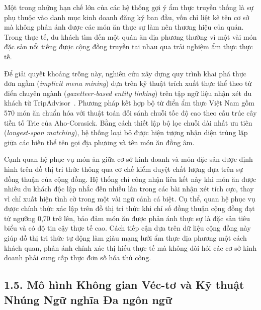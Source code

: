 Một trong những hạn chế lớn của các hệ thống gợi ý ẩm thực truyền thống là sự phụ thuộc vào danh mục kinh doanh đăng ký ban đầu, vốn chỉ liệt kê tên cơ sở mà không phản ánh được các món ăn thực sự làm nên thương hiệu của quán. Trong thực tế, du khách tìm đến một quán ăn địa phương thường vì một vài món đặc sản nổi tiếng được cộng đồng truyền tai nhau qua trải nghiệm ẩm thực thực tế.

Để giải quyết khoảng trống này, nghiên cứu xây dựng quy trình khai phá thực đơn ngầm (\textit{implicit menu mining}) dựa trên kỹ thuật trích xuất thực thể theo từ điển chuyên ngành (\textit{gazetteer-based entity linking}) trên tập ngữ liệu nhận xét du khách từ TripAdvisor~\cite{tripadvisor2024}. Phương pháp kết hợp bộ từ điển ẩm thực Việt Nam gồm 570 món ăn chuẩn hóa với thuật toán đối sánh chuỗi tốc độ cao theo cấu trúc cây tiền tố Trie của Aho-Corasick. Bằng cách thiết lập bộ lọc chuỗi dài nhất ưu tiên (\textit{longest-span matching}), hệ thống loại bỏ được hiện tượng nhận diện trùng lặp giữa các biến thể tên gọi địa phương và tên món ăn đồng âm.

Cạnh quan hệ phục vụ món ăn giữa cơ sở kinh doanh và món đặc sản được định hình trên đồ thị tri thức thông qua cơ chế kiểm duyệt chất lượng dựa trên sự đồng thuận của cộng đồng. Hệ thống chỉ công nhận liên kết này khi món ăn được nhiều du khách độc lập nhắc đến nhiều lần trong các bài nhận xét tích cực, thay vì chỉ xuất hiện tình cờ trong một vài ngữ cảnh cá biệt. Cụ thể, quan hệ phục vụ được chính thức xác lập trên đồ thị tri thức khi chỉ số đồng thuận cộng đồng đạt từ ngưỡng 0,70 trở lên, bảo đảm món ăn được phản ánh thực sự là đặc sản tiêu biểu và có độ tin cậy thực tế cao. Cách tiếp cận dựa trên dữ liệu cộng đồng này giúp đồ thị tri thức tự động làm giàu mạng lưới ẩm thực địa phương một cách khách quan, phản ánh chính xác thị hiếu thực tế mà không đòi hỏi các cơ sở kinh doanh phải cung cấp thực đơn số hóa thủ công.

\subsection*{1.5. Mô hình Không gian Véc-tơ và Kỹ thuật Nhúng Ngữ nghĩa Đa ngôn ngữ}
{}

